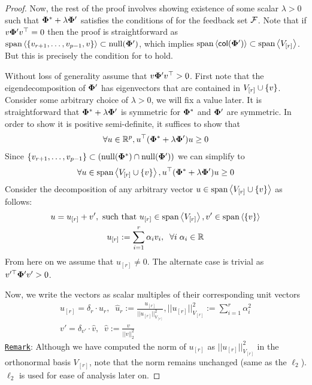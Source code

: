 \begin{proof}
    Now, the rest of the proof involves showing existence of some scalar $\lambda > 0$ such that $\boldsymbol{\Phi}^* + \lambda \boldsymbol{\Phi}'$ satisfies the conditions of  for the feedback set ${\mathcal{F}}$. Note that if $v\boldsymbol{\Phi}'v^{\top} = 0$ then the proof is straightforward as $ \text{span} \left<\left\{v_{r+1},\ldots,v_{p-1}, v\right\}\right> \subset \mathrm{null}({\boldsymbol{\Phi}'})$, which implies $\text{span} \left<\textsf{col}({\boldsymbol{\Phi}'})\right> \subset \text{span} \left<V_{[r]}\right>$. But this is precisely the condition for  to hold. 
    
     
     Without loss of generality assume that $v\boldsymbol{\Phi}'v^{\top} > 0$. First note that the eigendecomposition of $\boldsymbol{\Phi}'$ has eigenvectors that are contained in $V_{[r]} \cup \left\{v\right\}$. Consider some arbitrary choice of $\lambda > 0$, we will fix a value later. It is straightforward that $\boldsymbol{\Phi}^* + \lambda \boldsymbol{\Phi}'$ is symmetric for $\boldsymbol{\Phi}^*$ and $\boldsymbol{\Phi}'$ are symmetric. In order to show it is positive semi-definite, it suffices to show that
     \begin{align}
         \forall u \in \mathbb{R}^p, u^{\top}(\boldsymbol{\Phi}^* + \lambda \boldsymbol{\Phi}') u \ge 0 \label{eq: psd}
     \end{align}
    Since  $\left\{v_{r+1},\ldots, v_{p-1}\right\} \subset  \left( {\mathrm{null}({\boldsymbol{\Phi}^*}) \cap \mathrm{null}({\boldsymbol{\Phi}'})} \right) $ we can simplify  to
    \begin{align}
        \forall u \in \text{span}\left<V_{[r]} \cup \left\{v\right\}\right>, u^{\top}(\boldsymbol{\Phi}^* + \lambda \boldsymbol{\Phi}') u \ge 0 \label{eq: repsd}
    \end{align}
    Consider the decomposition of any arbitrary vector $u \in \text{span}\left<V_{[r]} \cup \left\{v\right\}\right>$ as follows:
    \begin{gather}
        u = u_{[r]} + v', \textnormal{ such that } u_{[r]} \in \text{span}\left<V_{[r]}\right>, v' \in \text{span} \left<\{v\}\right> \label{eq: decom1}\\
        u_{[r]} := \sum_{i =1}^r \alpha_i v_i,\;\; \forall i\; \alpha_i \in \mathbb{R} \label{eq: decom2}
    \end{gather}
    From here on we assume that $u_{[r]} \neq 0$. The alternate case is trivial as $v'^{\top}\boldsymbol{\Phi}'v' > 0$.
    
    Now, we write the vectors as scalar multiples of their corresponding unit vectors
    \begin{gather}
        u_{[r]} = \delta_r \cdot \hat{u}_r,\;\; \hat{u}_r := \frac{u_{[r]}}{||u_{[r]}||^2_{V_{[r]}}}, ||u_{[r]}||^2_{V_{[r]}} := \sum_{i =1}^r \alpha_i^2 \label{eq: scale1}\\
        v' = \delta_{v'}\cdot \hat{v},\;\; \hat{v} := \frac{v}{||v||_2^2} \label{eq: scale2}
    \end{gather}
    \underline{\tt{Remark}}: Although we have computed the norm of $ u_{[r]}$  as $||u_{[r]}||^2_{V_{[r]}}$ in the orthonormal basis $V_{[r]}$, note that the norm remains unchanged (same as the $\ell_2$). $\ell_2$ is used for ease of analysis later on.
    

\end{proof}
